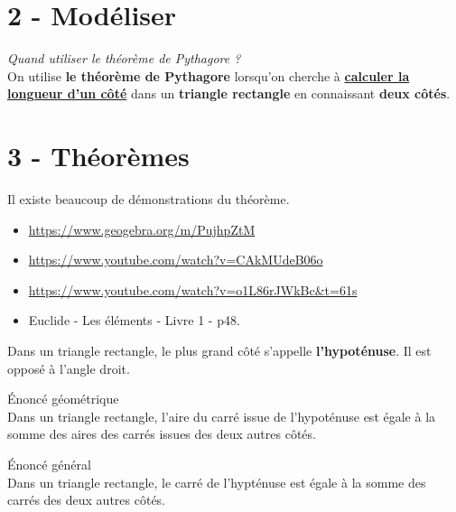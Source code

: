 \documentclass[12pt]{article}
\begin{document}
\newpage
\section*{2 - Modéliser}

\textit{Quand utiliser le théorème de Pythagore ?}\\

On utilise \textbf{le théorème de Pythagore} lorsqu'on cherche à \underline{\textbf{calculer la longueur d'un côté}} dans un \textbf{triangle rectangle} en connaissant \textbf{deux côtés}.



\section*{3 - Théorèmes}

Il existe beaucoup de démonstrations du théorème.

\begin{itemize}
	\item \url{https://www.geogebra.org/m/PujhpZtM}
	\item \url{https://www.youtube.com/watch?v=CAkMUdeB06o}
	\item \url{https://www.youtube.com/watch?v=o1L86rJWkBc&t=61s}
	\item Euclide - Les éléments - Livre 1 - p48.
\end{itemize}


\begin{Definition}
	Dans un triangle rectangle, le plus grand côté s'appelle \textbf{l'hypoténuse}. Il est opposé à l'angle droit.
\end{Definition}



\begin{Theorem}{Énoncé géométrique}\\
	Dans un triangle rectangle, l'aire du carré issue de l'hypoténuse est égale à la somme des aires des carrés issues des deux autres côtés.
\end{Theorem}

\begin{Theorem}{Énoncé général}\\
	Dans un triangle rectangle, le carré de l'hypténuse est égale à la somme des carrés des deux autres côtés.
\end{Theorem}
\end{document}
